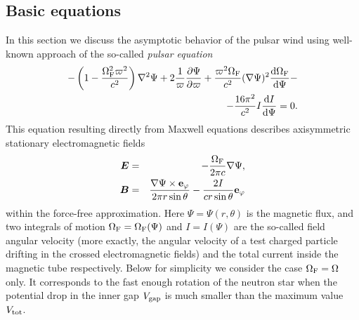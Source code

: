 \documentclass[useAMS,usenatbib]{mn2e}
\begin{document}
\subsection{Basic equations}

In this section we discuss the asymptotic behavior of the pulsar wind
using well-known approach of the so-called \textit{pulsar equation}
~\citep{1973Ap&SS..24..289M, 1974MNRAS.167..457O}
\begin{equation}
\begin{split}
-\left(1-\frac{\Omega_{\rm F}^2\varpi^2}{c^2}\right)\nabla^2\Psi
+2\frac{1}{\varpi}\frac{\partial\Psi}{\partial\varpi}
+\frac{\varpi^2\Omega_{\rm F}}{c^2}(\nabla\Psi)^2\frac{\mathrm{d}\Omega_{\rm F}}{\mathrm{d}\Psi}-
\\
-\frac{16\pi^2}{c^2}I\frac{\mathrm{d}I}{\mathrm{d}\Psi} = 0.
\label{G-SH}
\end{split}
\end{equation}
This equation resulting directly from Maxwell equations
describes axisymmetric stationary electromagnetic fields
\begin{eqnarray}
\bm{E} & = & -\frac{\Omega_{\rm F}}{2\pi c}\nabla\Psi,
\label{fieldsE} \\
\bm{B} & = & \frac{\nabla\Psi\times {\bf e}_{\varphi}}{2\pi r\sin\theta}
-\frac{2I}{cr\sin\theta} {\bf e}_{\varphi}
\label{fieldsB}
\end{eqnarray}
within the force-free approximation. Here $\Psi=\Psi(r,\theta)$ is the magnetic
flux, and two integrals of motion $\Omega_{\rm F}=\Omega_{\rm F}(\Psi)$ 
and $I=I(\Psi)$ are the so-called field angular velocity (more exactly, the angular
velocity of a test charged particle drifting in the crossed electromagnetic fields) 
and the total current inside the magnetic tube respectively. Below for simplicity we  
consider the case $\Omega_{\rm F} = \Omega$ only. It corresponds to the fast enough 
rotation of the neutron star when the potential drop in the inner gap $V_{\rm gap}$ 
is much smaller than the maximum value $V_{\rm tot}$.
\end{document}

